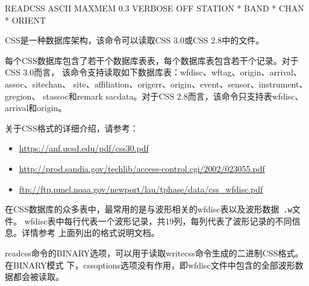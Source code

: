 \begin{SACSTX}
READCSS ASCII MAXMEM 0.3 VERBOSE OFF STATION * BAND * CHAN * ORIENT
\end{SACSTX}

CSS是一种数据库架构，该命令可以读取CSS 3.0或CSS 2.8中的文件。

每个CSS数据库包含了若干个数据库表表，每个数据库表包含若干个记录。对于CSS 3.0而言，
该命令支持读取如下数据库表：wfdisc、wftag、origin、arrival、assoc、sitechan、
site、affiliation、origerr、origin、event、sensor、instrument、gregion、
stassoc和remark sacdata。对于CSS 2.8而言，该命令只支持表wfdisc、arrival和origin。

关于CSS格式的详细介绍，请参考：
\begin{itemize}
\item \url{https://anf.ucsd.edu/pdf/css30.pdf}
\item \url{http://prod.sandia.gov/techlib/access-control.cgi/2002/023055.pdf}
\item \url{ftp://ftp.pmel.noaa.gov/newport/lau/tphase/data/css_wfdisc.pdf}
\end{itemize}

在CSS数据库的众多表中，最常用的是与波形相关的wfdisc表以及波形数据~\verb+.w+文件。
wfdisc表中每行代表一个波形记录，共19列，每列代表了波形记录的不同信息。详情参考
上面列出的格式说明文档。

readcss命令的BINARY选项，可以用于读取writecss命令生成的二进制CSS格式。在BINARY模式
下，cssoptions选项没有作用，即wfdisc文件中包含的全部波形数据都会被读取。

